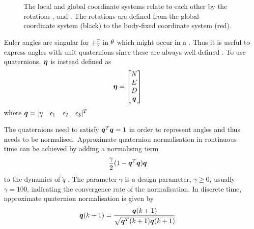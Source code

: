 \begin{figure}
    \caption{The local and global coordinate systems relate to each other by the rotations \yawAngle, \pitchAngle and \rollAngle. The rotations are defined from the global coordinate system (black) to the body-fixed coordinate system (red).} 
    \label{fig:coordinate_frames}
\end{figure}




 
Euler angles are singular for $\pm \frac{\pi}{2}$ in $\theta$ which might occur in a \abbrROV. Thus it is useful to express angles with unit quaternions since these are always well defined \citep{sensorfusion}. To use quaternions, $\boldsymbol{\eta}$ is instead defined as
\begin{equation}
\boldsymbol{\eta} = \begin{bmatrix}
N \\
E \\
D \\
\boldsymbol{q}
\end{bmatrix}
\end{equation} where $\boldsymbol{q} =[\eta\quad \epsilon_1\quad \epsilon_2\quad \epsilon_3]^T$

The quaternions need to satisfy $\boldsymbol{q}^T\boldsymbol{q} = 1$ in order to represent angles and thus needs to be normalised.
Approximate quaternion normalisation in continuous time can be achieved by adding a normalising term
\begin{equation}
\frac{\gamma}{2} ( 1 - \boldsymbol{q}^T\boldsymbol{q})\boldsymbol{q}
\end{equation}
to the dynamics of $\dot{q}$ \citep[p. 31]{fossen2011}. The parameter $\gamma$ is a design parameter, $\gamma \geq 0$, usually $\gamma = 100$, indicating the convergence rate of the normalisation. In discrete time, approximate quaternion normalisation is given by 
\begin{equation} \label{eq:quatnorm}
\boldsymbol{q}(k+1) = \frac{\boldsymbol{q}(k+1)}{\sqrt{\boldsymbol{q}^T(k+1)\boldsymbol{q}(k+1)}}
\end{equation}  

